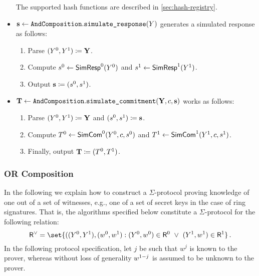 \documentclass[runningheads,11pt]{article}
\begin{document}
\begin{itemize}
\[   \]
   The supported hash functions are described in \cref{sec:hash-registry}.
  \item
  $\mathbf {s} \gets \texttt{AndComposition}.\texttt{simulate\_response}(Y)$
   generates a simulated response as follows:
    \begin{enumerate}
      \item
        Parse $(Y^0,Y^1)\coloneqq \mathbf {Y}$.
      \item
        Compute $s^0\gets\textsf{SimResp}^0(Y^0)$ and $s^1\gets\textsf{SimResp}^1(Y^1)$.
      \item
        Output $\mathbf {s}\coloneqq(s^0,s^1)$.
    \end{enumerate}
  \item
  $\mathbf {T} \gets \texttt{AndComposition}.\texttt{simulate\_commitment}(\mathbf {Y}, c, \mathbf {s})$ works as follows:
    \begin{enumerate}
      \item
        Parse $(Y^0,Y^1)\coloneqq \mathbf{Y}$ and $(s^0,s^1)\coloneqq\mathbf{s}$.
      \item
        Compute $T^0\gets\textsf{SimCom}^0(Y^0,c,s^0)$ and $T^1\gets\textsf{SimCom}^1(Y^1,c,s^1)$.
      \item
        Finally, output $\mathbf {T}\coloneqq(T^0, T^1)$.
      \end{enumerate}
\end{itemize}



\subsubsection{OR Composition}
  In the following we explain how to construct a $\Sigma$-protocol proving knowledge of one out of a set of witnesses, e.g., one of a set of secret keys in the case of ring signatures.
  That is, the algorithms specified below constitute a $\Sigma$-protocol for the following relation:
\[
  \relation^\lor = \set{
    ((\statement^0,\statement^1),(\witness^0,\witness^1) :
    (\statement^0,\witness^0)\in \relation^0 ~\lor~ (\statement^1,\witness^1)\in\relation^1}\,.
\]
  In the following protocol specification, let $j$ be such that $w^j$ is known to the prover, whereas without loss of generality $w^{1-j}$ is assumed to be unknown to the prover.
\end{document}
